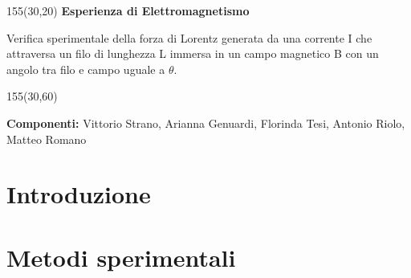 \documentclass[a4paper,10pt,oneside]{memoir}
\begin{document}
\begin{center}
\vspace*{5.8cm}

\setlength{\TPHorizModule}{1mm}
\setlength{\TPVertModule}{\TPHorizModule}

\newlength{\backupparindent}
\setlength{\backupparindent}{\parindent}
\setlength{\parindent}{0mm}

\begin{textblock}{155}(30,20)
    \vspace*{1mm}
    \huge
    \textbf{Esperienza di Elettromagnetismo\\}
    \LARGE
    \vspace*{5mm}
    \begin{flushleft}
    {Verifica sperimentale della forza di Lorentz generata da una corrente I che attraversa un filo di lunghezza L immersa in un campo magnetico B con un angolo tra filo e campo uguale a $\theta$.}
    \\
    \end{flushleft}
    \textbf{}
    \par
    \vspace*{15mm}
    \Large
    \begin{textblock}{155}(30,60)
    \begin{flushleft}
        \Large
           
            
             \textbf{Componenti:} Vittorio Strano, Arianna Genuardi, Florinda Tesi, Antonio Riolo, Matteo Romano
            
            
            


    \end{flushleft}
    \end{textblock}
\end{textblock}




\setlength{\parindent}{\backupparindent}
\end{center}





\tableofcontents*



\newpage
\normalsize
{}
\section{Introduzione}
 

\section{Metodi sperimentali}
\end{document}
